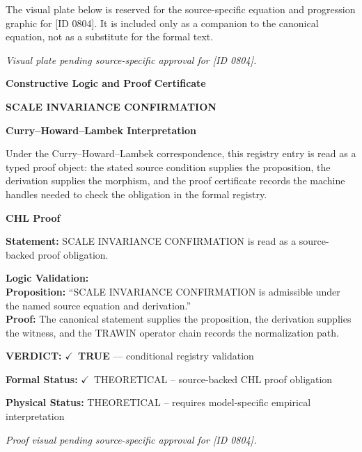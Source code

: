 \begingroup\footnotesize\sloppy
The visual plate below is reserved for the source-specific equation and progression graphic for [ID 0804]. It is included only as a companion to the canonical equation, not as a substitute for the formal text.
\par\endgroup
\begingroup\footnotesize\itshape
Visual plate pending source-specific approval for [ID 0804].
\par\endgroup

\clearpage
\begingroup\tzpsupportsetup
\noindent\textbf{\fontsize{10.8pt}{12.8pt}\selectfont [ID 0804] Constructive Logic and Proof Certificate}\par
\noindent\textbf{\fontsize{10pt}{12pt}\selectfont SCALE INVARIANCE CONFIRMATION}\par
\vspace{0.45em}
\begingroup
\footnotesize
\setlength{\parskip}{0.22em}
\setlength{\parindent}{0pt}
\noindent\textbf{Curry--Howard--Lambek Interpretation}\par
Under the Curry--Howard--Lambek correspondence, this registry entry is read as a typed proof
object: the stated source condition supplies the proposition, the derivation supplies the
morphism, and the proof certificate records the machine handles needed to check the obligation
in the formal registry.

\vspace{0.45em}
\noindent\textbf{CHL Proof}\par
\textbf{Statement:} SCALE INVARIANCE CONFIRMATION is read as a source-backed proof obligation.

\textbf{Logic Validation:}\\
\textbf{Proposition:} ``SCALE INVARIANCE CONFIRMATION is admissible under the named source equation and derivation.''\\
\textbf{Proof:} The canonical statement supplies the proposition, the derivation supplies the witness, and the TRAWIN operator chain records the normalization path.

\textbf{VERDICT:} \ensuremath{\checkmark}\ \textbf{TRUE} --- conditional registry validation

\textbf{Formal Status:} \ensuremath{\checkmark}\ THEORETICAL -- source-backed CHL proof obligation

\textbf{Physical Status:} THEORETICAL -- requires model-specific empirical interpretation
\par\vspace{0.45em}
\par
\vfill
\begingroup\footnotesize\itshape
Proof visual pending source-specific approval for [ID 0804].
\par\endgroup
\vfill
\endgroup
\endgroup
